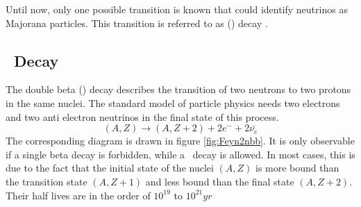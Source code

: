 \documentclass[encoding=utf8,british]{tumphthesis}
\begin{document}
Until now, only one possible transition is known that could identify neutrinos as Majorana particles.
This transition is referred to as (\onbb) decay \cite{noauthor_phys._nodate-1}.
 



\subsection{\onbb\ Decay}
\label{sec:0nubetabeta}

The double beta (\twonu) decay describes the transition of two neutrons to two protons in the same nuclei.
The standard model of particle physics needs two electrons and two anti electron neutrinos in the final state of this process.
\begin{equation}
(A,Z)\rightarrow (A,Z+2) + 2e^- + 2\bar{\nu_e}
\end{equation} 
The corresponding diagram is drawn in figure \ref{fig:Feyn2nbb}.
It is only observable if a single beta decay is forbidden, while a \twonu\ decay is allowed.
In most cases, this is due to the fact that the initial state of the nuclei $(A,Z)$ is more bound than the transition state $(A,Z+1)$ and less bound than the final state $(A,Z+2)$.
Their half lives are in the order of $10^{19}$ to $10^{21} \unit{yr}$
\\
\end{document}
